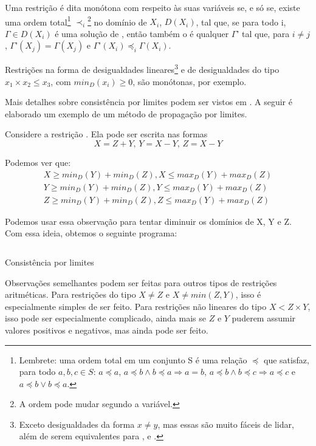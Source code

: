\begin{definition}
  Uma restrição  é dita monótona com respeito às suas
  variáveis  se, e só se, existe uma ordem
  total\footnote{Lembrete: uma ordem total em um conjunto S é uma
    relação $\preceq$ que satisfaz, para todo $a, b, c \in S$: $a
    \preceq a$, $a \preceq b \wedge b \preceq a \Rightarrow a = b$,
    $a\preceq b \wedge b \preceq c \Rightarrow a \preceq c$ e
    $a\preceq b \vee b\preceq a$.}  $\prec_i$\footnote{A ordem pode
    mudar segundo a variável.}  no domínio de $X_i$, $D(X_i)$,
  tal que, se para todo i, $\Gamma \in D(X_i)$ é uma solução de
  , então também o é qualquer $\Gamma$' tal que, para $i
  \neq j$, $\Gamma$'$(X_j) = \Gamma(X_j)$ e $\Gamma$'$(X_i) \preceq_i
  \Gamma(X_i)$.
\end{definition}

Restrições na forma de desigualdades lineares\footnote{Exceto
  desigualdades da forma $x \neq y$, mas essas são muito fáceis de
  lidar, além de serem equivalentes para \boundd, \boundz{} e
  \boundr.} e de desigualdades do tipo $x_1 \times x_2 \leq x_3$, com
$min_D(x_i) \geq 0$, são monótonas, por exemplo.

Mais detalhes sobre consistência por limites podem ser vistos em
\cite{choi}. A seguir é elaborado um exemplo de um método de
propagação por limites.

Considere a restrição . Ela pode ser escrita nas
formas
\[
X = Z + Y \text{, } Y = X - Y \text{, } Z = X - Y
\]

Podemos ver que:
\begin{gather}
  X \geq min_D(Y)+min_D(Z), X \leq max_D(Y) + max_D(Z)\\ Y \geq
  min_D(Y)+min_D(Z), Y \leq max_D(Y) + max_D(Z)\\ Z \geq
  min_D(Y)+min_D(Z), Z \leq max_D(Y) + max_D(Z)
\end{gather}

Podemos usar essa observação para tentar diminuir os domínios de X, Y
e Z. Com essa ideia, obtemos o seguinte programa:

\begin{listing}[H]
  \inputminted{prolog}{../Exemplos/Cap9/bounds_consistency.pl}
  \caption{Consistência por limites}\label{lst:bounds}
\end{listing}

Observações semelhantes podem ser feitas para outros tipos de
restrições aritméticas. Para restrições do tipo $X \neq Z$ e $X \neq
min(Z, Y)$, isso é especialmente simples de ser feito. Para restrições
não lineares do tipo $X < Z\times Y$, isso pode ser especialmente
complicado, ainda mais se $Z$ e $Y$ puderem assumir valores positivos
e negativos, mas ainda pode ser feito.

